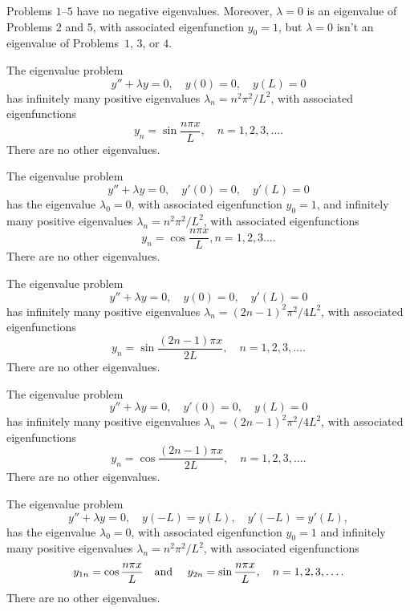 \setcounter{theorem}{0}
\begin{theorem}
  \label{thmtype:11.1.1} Problems $1$--$5$ have no negative eigenvalues. Moreover, $\lambda=0$ is an
  eigenvalue of Problems $2$ and $5$, with associated eigenfunction $y_{0}=1$, but $\lambda=0$ isn't
  an eigenvalue of Problems~$1$, $3$, or $4$.
\end{theorem}

\setcounter{theorem}{1}
\begin{theorem}
  \label{thmtype:11.1.2} The eigenvalue problem
  \[
    y''+\lambda y=0,\quad y(0)=0,\quad y(L)=0
  \]
  has infinitely many positive eigenvalues $\lambda_{n}=n^{2}\pi^{2}/L^{2}$, with associated
  eigenfunctions
  \[
    y_{n}=\sin\frac{n\pi x}{L},\quad n=1,2,3,\dots.
  \]
  There are no other eigenvalues.
\end{theorem}

\setcounter{theorem}{2}
\begin{theorem}
  \label{thmtype:11.1.3} The eigenvalue problem
  \[
    y''+\lambda y=0,\quad y'(0)=0,\quad y'(L)=0
  \]
  has the eigenvalue $\lambda_{0}=0$, with associated eigenfunction $y_{0}=1$, and infinitely many
  positive eigenvalues $\lambda_{n}=n^{2}\pi^{2}/L^{2}$, with associated eigenfunctions
  \[
    y_{n}=\cos\frac{n\pi x}{L},n=1,2,3\dots.
  \]
  There are no other eigenvalues.
\end{theorem}

\setcounter{theorem}{3}
\begin{theorem}
  \label{thmtype:11.1.4} The eigenvalue problem
  \[
    y''+\lambda y=0,\quad y(0)=0,\quad y'(L)=0
  \]
  has infinitely many positive eigenvalues $\lambda_{n}=(2n-1)^{2}\pi^{2}/4L^{2}$, with associated
  eigenfunctions
  \[
    y_{n}=\sin\frac{(2n-1)\pi x}{2L},\quad n=1,2,3,\dots.
  \]
  There are no other eigenvalues.
\end{theorem}

\setcounter{theorem}{4}
\begin{theorem}
  \label{thmtype:11.1.5} The eigenvalue problem
  \[
    y''+\lambda y=0,\quad y'(0)=0,\quad y(L)=0
  \]
  has infinitely many positive eigenvalues $\lambda_{n}=(2n-1)^{2}\pi^{2}/4L^{2}$, with associated
  eigenfunctions
  \[
    y_{n}=\cos\frac{(2n-1)\pi x}{2L},\quad n=1,2,3,\dots.
  \]
  There are no other eigenvalues.
\end{theorem}

\setcounter{theorem}{5}
\begin{theorem}
  \label{thmtype:11.1.6} The eigenvalue problem
  \[
    y''+\lambda y=0,\quad y(-L)=y(L),\quad y'(-L)=y'(L),
  \]
  has the eigenvalue $\lambda_{0}=0$, with associated eigenfunction $y_{0}=1$ and infinitely many
  positive eigenvalues $\lambda_{n}=n^{2}\pi^{2}/L^{2}$, with associated eigenfunctions
  \[
    y_{1n}=\cos\frac{n\pi x}{L}\mbox{\quad and \quad}y_{2n}=\sin\frac{n\pi x}{L},\quad n=1,2,3,\dots.
  \]
  There are no other eigenvalues.
\end{theorem}

